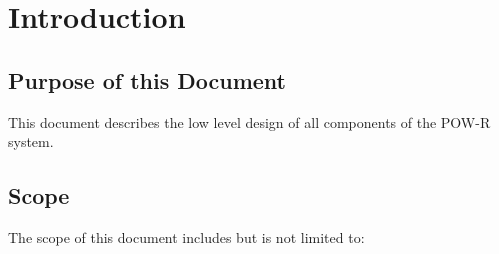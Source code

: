 \chapter{Introduction}

\section{Purpose of this Document}
This document describes the low level design of all components of the \ac{POW-R} system.

\section{Scope}
The scope of this document includes but is not limited to: 


